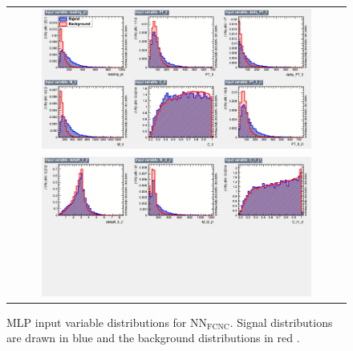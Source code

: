 \begin{figure}[ht]
  \begin{center}
    \begin{tabular}{c}
      \includegraphics[width=0.82\textwidth]{figures/tW/fig/MVA/MLP_FCNC/var_1.png}\\
      \includegraphics[width=0.82\textwidth]{figures/tW/fig/MVA/MLP_FCNC/var_2.png}\\
    \end{tabular}
    \caption{MLP input variable distributions for NN$_{\text{FCNC}}$. Signal distributions are drawn in blue and the background distributions in red \cite{CMS-AN-2017-132}.}
    \label{fig:input_var_FCNC}
  \end{center}
\end{figure}



